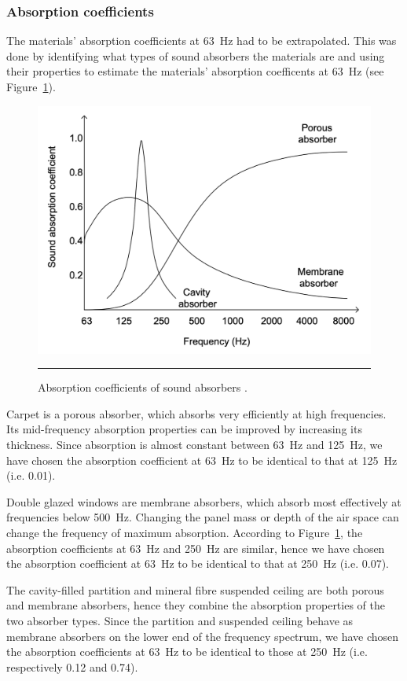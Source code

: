 \subsubsection{Absorption coefficients}

The materials' absorption coefficients at 63~Hz had to be extrapolated.
This was done by identifying what types of sound absorbers the materials are and using their properties to estimate the materials' absorption coefficents at 63~Hz (see Figure~\ref{fig:absorbers}).


\begin{figure}[htbp]
	\centering
	\includegraphics[width=.6\textwidth]{figures/Absorbers.png}
	\rule{.8\textwidth}{0.5pt} %
	\caption{Absorption coefficients of sound absorbers \citep{unit4}.}
	\label{fig:absorbers}
\end{figure}


Carpet is a porous absorber, which absorbs very efficiently at high frequencies.
Its mid-frequency absorption properties can be improved by increasing its thickness.
Since absorption is almost constant between 63~Hz and 125~Hz, we have chosen the absorption coefficient at 63~Hz to be identical to that at 125~Hz (i.e. 0.01).

Double glazed windows are membrane absorbers, which absorb most effectively at frequencies below 500~Hz.
Changing the panel mass or depth of the air space can change the frequency of maximum absorption.
According to Figure~\ref{fig:absorbers}, the absorption coefficients at 63~Hz and 250~Hz are similar, hence we have chosen the absorption coefficient at 63~Hz to be identical to that at 250~Hz (i.e. 0.07).

The cavity-filled partition and mineral fibre suspended ceiling are both porous and membrane absorbers, hence they combine the absorption properties of the two absorber types.
Since the partition and suspended ceiling behave as membrane absorbers on the lower end of the frequency spectrum, we have chosen the absorption coefficients at 63~Hz to be identical to those at 250~Hz (i.e. respectively 0.12 and 0.74).

